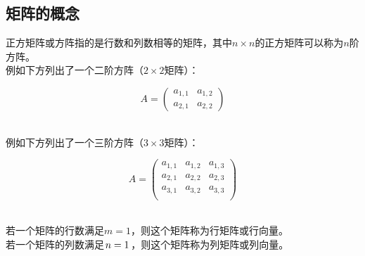 \documentclass[UTF8]{ctexart}
\begin{document}
\subsection{矩阵的概念}
    正方矩阵或方阵指的是行数和列数相等的矩阵，其中$n\times n$的正方矩阵可以称为$n$阶方阵。\\[3mm]
    例如下方列出了一个二阶方阵（$2\times 2$矩阵）：
    \begin{large}
        \begin{equation*}
            A=
            \begin{pmatrix}
                a_{1,1}&a_{1,2}\\
                a_{2,1}&a_{2,2}
            \end{pmatrix}
        \end{equation*}
    \end{large}\\
    例如下方列出了一个三阶方阵（$3\times 3$矩阵）：
    \begin{large}
        \begin{equation*}
            A=
            \begin{pmatrix}
                a_{1,1}&a_{1,2}&a_{1,3}\\
                a_{2,1}&a_{2,2}&a_{2,3}\\
                a_{3,1}&a_{3,2}&a_{3,3}\\
            \end{pmatrix}
        \end{equation*}
    \end{large}\\
    若一个矩阵的行数满足$m=1$，则这个矩阵称为行矩阵或行向量。\\[3mm]
    若一个矩阵的列数满足$\hspace{1.0pt}n=1\hspace{1.0pt}$，则这个矩阵称为列矩阵或列向量。

\newpage
\end{document}

